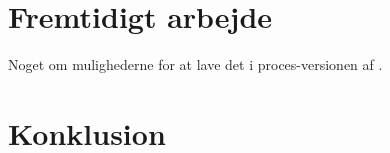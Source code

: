 \section{Fremtidigt arbejde}
Noget om mulighederne for at lave det i proces-versionen af \pycsp.
\section{Konklusion}
